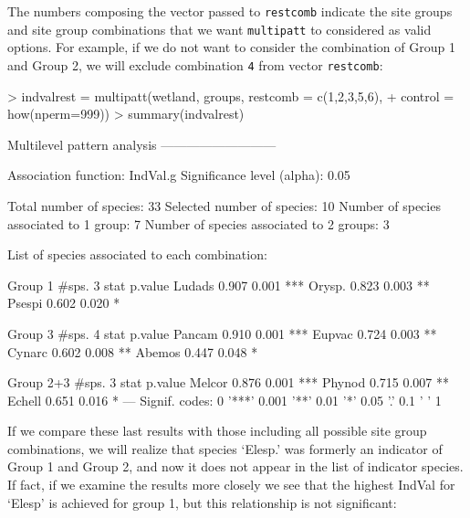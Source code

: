 \documentclass[11pt,a4paper]{article}
\begin{document}
The numbers composing the vector passed to \texttt{restcomb} indicate the site groups and site group combinations that we want \texttt{multipatt} to considered as valid options. For example, if we do not want to consider the combination of Group 1 and Group 2, we will exclude combination \texttt{4} from vector \texttt{restcomb}:
\begin{Schunk}
\begin{Sinput}
> indvalrest = multipatt(wetland, groups, restcomb = c(1,2,3,5,6), 
+                        control = how(nperm=999)) 
> summary(indvalrest)
\end{Sinput}
\begin{Soutput}
 Multilevel pattern analysis
 ---------------------------

 Association function: IndVal.g
 Significance level (alpha): 0.05

 Total number of species: 33
 Selected number of species: 10 
 Number of species associated to 1 group: 7 
 Number of species associated to 2 groups: 3 

 List of species associated to each combination: 

 Group 1  #sps.  3 
        stat p.value    
Ludads 0.907   0.001 ***
Orysp. 0.823   0.003 ** 
Psespi 0.602   0.020 *  

 Group 3  #sps.  4 
        stat p.value    
Pancam 0.910   0.001 ***
Eupvac 0.724   0.003 ** 
Cynarc 0.602   0.008 ** 
Abemos 0.447   0.048 *  

 Group 2+3  #sps.  3 
        stat p.value    
Melcor 0.876   0.001 ***
Phynod 0.715   0.007 ** 
Echell 0.651   0.016 *  
---
Signif. codes:  0 '***' 0.001 '**' 0.01 '*' 0.05 '.' 0.1 ' ' 1 
\end{Soutput}
\end{Schunk}
If we compare these last results with those including all possible site group combinations, we will realize that species `Elesp.' was formerly an indicator of Group 1 and Group 2, and now it does not appear in the list of indicator species. If fact, if we examine the results more closely we see that the highest IndVal for `Elesp' is achieved for group 1, but this relationship is not significant:
\end{document}
